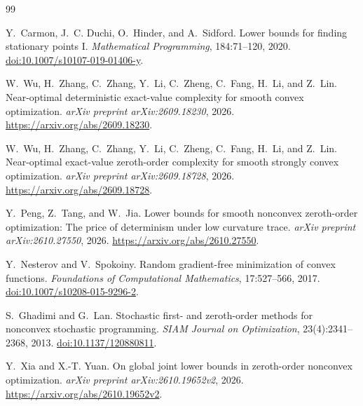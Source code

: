 \documentclass[11pt]{article}
\numberwithin{equation}{section}
\theoremstyle{definition}
\theoremstyle{remark}
\begin{document}
\begin{thebibliography}{99}

Y.~Carmon, J.~C. Duchi, O.~Hinder, and A.~Sidford.
\newblock Lower bounds for finding stationary points I.
\newblock \emph{Mathematical Programming}, 184:71--120, 2020.
\newblock \href{https://doi.org/10.1007/s10107-019-01406-y}{doi:10.1007/s10107-019-01406-y}.

W.~Wu, H.~Zhang, C.~Zhang, Y.~Li, C.~Zheng, C.~Fang, H.~Li, and Z.~Lin.
\newblock Near-optimal deterministic exact-value complexity for smooth convex optimization.
\newblock \emph{arXiv preprint arXiv:2609.18230}, 2026.
\newblock \url{https://arxiv.org/abs/2609.18230}.

W.~Wu, H.~Zhang, C.~Zhang, Y.~Li, C.~Zheng, C.~Fang, H.~Li, and Z.~Lin.
\newblock Near-optimal exact-value zeroth-order complexity for smooth strongly convex optimization.
\newblock \emph{arXiv preprint arXiv:2609.18728}, 2026.
\newblock \url{https://arxiv.org/abs/2609.18728}.

Y.~Peng, Z.~Tang, and W.~Jia.
\newblock Lower bounds for smooth nonconvex zeroth-order optimization:
The price of determinism under low curvature trace.
\newblock \emph{arXiv preprint arXiv:2610.27550}, 2026.
\newblock \url{https://arxiv.org/abs/2610.27550}.

Y.~Nesterov and V.~Spokoiny.
\newblock Random gradient-free minimization of convex functions.
\newblock \emph{Foundations of Computational Mathematics}, 17:527--566, 2017.
\newblock \href{https://doi.org/10.1007/s10208-015-9296-2}{doi:10.1007/s10208-015-9296-2}.

S.~Ghadimi and G.~Lan.
\newblock Stochastic first- and zeroth-order methods for nonconvex stochastic
programming.
\newblock \emph{SIAM Journal on Optimization}, 23(4):2341--2368, 2013.
\newblock \href{https://doi.org/10.1137/120880811}{doi:10.1137/120880811}.

Y.~Xia and X.-T. Yuan.
\newblock On global joint lower bounds in zeroth-order nonconvex optimization.
\newblock \emph{arXiv preprint arXiv:2610.19652v2}, 2026.
\newblock \url{https://arxiv.org/abs/2610.19652v2}.


\end{thebibliography}
\end{document}
